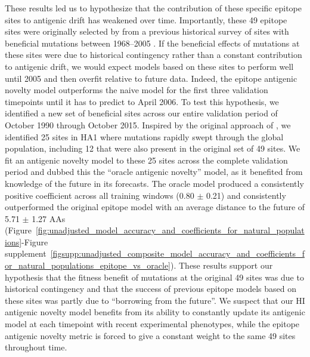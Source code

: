 These results led us to hypothesize that the contribution of these specific epitope sites to antigenic drift has weakened over time.
Importantly, these 49 epitope sites were originally selected by \cite{Luksza:2014hj} from a previous historical survey of sites with beneficial mutations between 1968--2005 \citep{Shih:2007bd}.
If the beneficial effects of mutations at these sites were due to historical contingency rather than a constant contribution to antigenic drift, we would expect models based on these sites to perform well until 2005 and then overfit relative to future data.
Indeed, the epitope antigenic novelty model outperforms the naive model for the first three validation timepoints until it has to predict to April 2006.
To test this hypothesis, we identified a new set of beneficial sites across our entire validation period of October 1990 through October 2015.
Inspired by the original approach of \cite{Shih:2007bd}, we identified 25 sites in HA1 where mutations rapidly swept through the global population, including 12 that were also present in the original set of 49 sites.
We fit an antigenic novelty model to these 25 sites across the complete validation period and dubbed this the ``oracle antigenic novelty'' model, as it benefited from knowledge of the future in its forecasts.
The oracle model produced a consistently positive coefficient across all training windows (0.80 $\pm$ 0.21) and consistently outperformed the original epitope model with an average distance to the future of 5.71 $\pm$ 1.27 AAs (Figure~\ref{fig:unadjusted_model_accuracy_and_coefficients_for_natural_populations}-Figure supplement~\ref{figsupp:unadjusted_composite_model_accuracy_and_coefficients_for_natural_populations_epitope_vs_oracle}).
These results support our hypothesis that the fitness benefit of mutations at the original 49 sites was due to historical contingency and that the success of previous epitope models based on these sites was partly due to ``borrowing from the future''.
We suspect that our HI antigenic novelty model benefits from its ability to constantly update its antigenic model at each timepoint with recent experimental phenotypes, while the epitope antigenic novelty metric is forced to give a constant weight to the same 49 sites throughout time.

